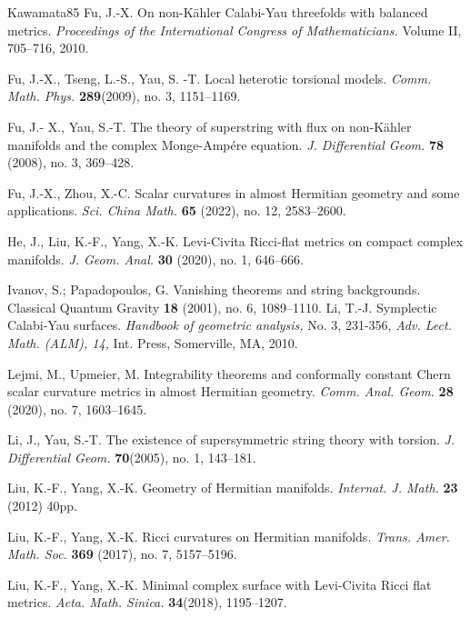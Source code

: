 \documentclass[12pt, reqno]{amsart}
\theoremstyle{plain}
\theoremstyle{definition}
\renewcommand{\>}{\rightarrow}
\renewcommand{\>}{\rightarrow}
\numberwithin{equation}{section} %
\begin{document}
\begin{thebibliography}{Kawamata85}
     Fu, J.-X. On non-K\"ahler Calabi-Yau threefolds with balanced metrics.
    \emph{Proceedings of the International Congress of Mathematicians.}
    Volume II, 705--716, 2010.


     Fu, J.-X., Tseng, L.-S., Yau, S. -T. Local heterotic torsional models.
    \emph{Comm. Math. Phys.} \textbf{289}(2009), no. 3, 1151--1169.

     Fu, J.- X., Yau, S.-T. The theory of superstring with flux on non-K\"ahler manifolds and the complex Monge-Amp\'ere equation.
    \emph{J. Differential Geom.} \textbf{78} (2008), no. 3, 369--428.

     Fu, J.-X., Zhou, X.-C. Scalar curvatures in almost Hermitian geometry and some
    applications. \emph{Sci. China Math.} \textbf{65} (2022), no. 12, 2583--2600.


     He, J., Liu, K.-F., Yang, X.-K. Levi-Civita Ricci-flat metrics on compact complex manifolds.
    \emph{J. Geom. Anal.} \textbf{30} (2020), no. 1, 646--666.

 Ivanov, S.; Papadopoulos, G. Vanishing theorems and string backgrounds. Classical Quantum Gravity \textbf{18} (2001), no. 6, 1089--1110.
     Li, T.-J.  Symplectic Calabi-Yau surfaces.
    \emph{Handbook of geometric analysis,} No. 3, 231-356, \emph{Adv.
        Lect. Math. (ALM), 14,} Int. Press, Somerville, MA, 2010.


     Lejmi, M., Upmeier, M. Integrability theorems and conformally constant Chern
    scalar curvature metrics in almost Hermitian geometry. \emph{Comm. Anal. Geom.}  \textbf{28} (2020), no. 7, 1603--1645.

     Li, J., Yau, S.-T. The existence of supersymmetric string theory with torsion.
    \emph{J. Differential Geom.} \textbf{70}(2005), no. 1, 143--181.

     Liu, K.-F., Yang, X.-K. Geometry of Hermitian manifolds.
    \emph{Internat. J. Math.} \textbf{23} (2012) 40pp.



     Liu, K.-F., Yang, X.-K. Ricci curvatures on Hermitian manifolds.
    \emph{Trans. Amer. Math. Soc.} \textbf{369} (2017), no. 7,
    5157--5196.

     Liu, K.-F., Yang, X.-K. Minimal complex surface with Levi-Civita Ricci flat metrics.
    \emph{Acta. Math. Sinica.} \textbf{34}(2018), 1195--1207.


\end{thebibliography}
\end{document}
